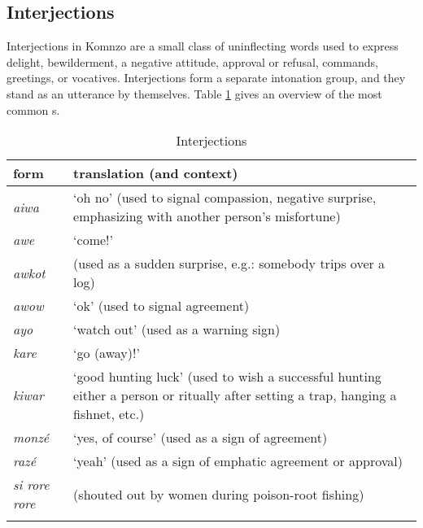 \subsection{Interjections} \label{interjectionsec}
\vspace{-0.2cm}
Interjections in Komnzo are a small class of uninflecting words used to express delight, bewilderment, a negative attitude, approval or refusal, commands, greetings, or vocatives. Interjections form a separate intonation group, and they stand as an utterance by themselves. Table \ref{interjections} gives an overview of the most common s.
\vspace{-0.2cm}
\begin{table}
\caption{Interjections}
\label{interjections}
	\begin{tabularx}{\textwidth}{Xp{}}
		\lsptoprule
		{form}&{translation (and context)}\\\midrule
		\emph{aiwa}&`oh no' (used to signal compassion, negative surprise, emphasizing with another person's misfortune)\\
		\emph{awe}&`come!'\\
		\emph{awkot}& (used as a sudden surprise, e.g.: somebody trips over a log)\\
		\emph{awow}&`ok' (used to signal agreement)\\
		\emph{ayo}&`watch out' (used as a warning sign)\\
		\emph{kare}&`go (away)!'\\
		\emph{kiwar}&`good hunting luck' (used to wish a successful hunting either a person or ritually after setting a trap, hanging a fishnet, etc.)\\
		\emph{monzé}&`yes, of course' (used as a sign of agreement)\\
		\emph{razé}&`yeah' (used as a sign of emphatic agreement or approval)\\
		\emph{si rore rore}& (shouted out by women during poison-root fishing)\\
		\lspbottomrule
	\end{tabularx}
\end{table}%